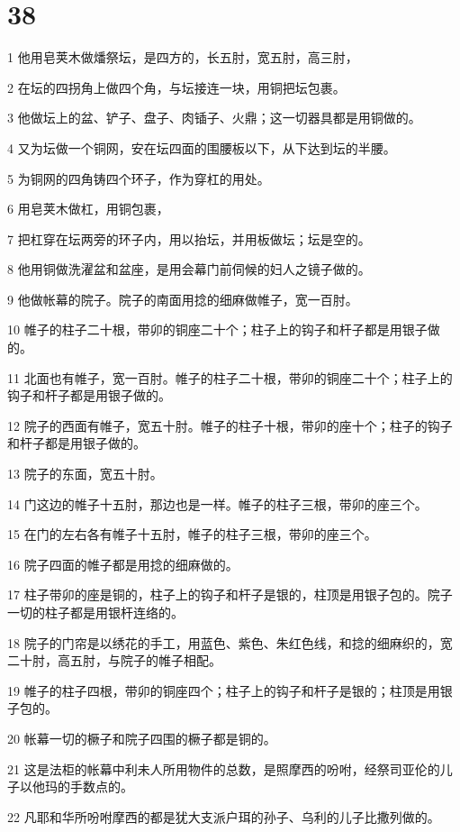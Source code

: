 \chapter{38}

\par 1 他用皂荚木做燔祭坛，是四方的，长五肘，宽五肘，高三肘，
\par 2 在坛的四拐角上做四个角，与坛接连一块，用铜把坛包裹。
\par 3 他做坛上的盆、铲子、盘子、肉锸子、火鼎；这一切器具都是用铜做的。
\par 4 又为坛做一个铜网，安在坛四面的围腰板以下，从下达到坛的半腰。
\par 5 为铜网的四角铸四个环子，作为穿杠的用处。
\par 6 用皂荚木做杠，用铜包裹，
\par 7 把杠穿在坛两旁的环子内，用以抬坛，并用板做坛；坛是空的。
\par 8 他用铜做洗濯盆和盆座，是用会幕门前伺候的妇人之镜子做的。
\par 9 他做帐幕的院子。院子的南面用捻的细麻做帷子，宽一百肘。
\par 10 帷子的柱子二十根，带卯的铜座二十个；柱子上的钩子和杆子都是用银子做的。
\par 11 北面也有帷子，宽一百肘。帷子的柱子二十根，带卯的铜座二十个；柱子上的钩子和杆子都是用银子做的。
\par 12 院子的西面有帷子，宽五十肘。帷子的柱子十根，带卯的座十个；柱子的钩子和杆子都是用银子做的。
\par 13 院子的东面，宽五十肘。
\par 14 门这边的帷子十五肘，那边也是一样。帷子的柱子三根，带卯的座三个。
\par 15 在门的左右各有帷子十五肘，帷子的柱子三根，带卯的座三个。
\par 16 院子四面的帷子都是用捻的细麻做的。
\par 17 柱子带卯的座是铜的，柱子上的钩子和杆子是银的，柱顶是用银子包的。院子一切的柱子都是用银杆连络的。
\par 18 院子的门帘是以绣花的手工，用蓝色、紫色、朱红色线，和捻的细麻织的，宽二十肘，高五肘，与院子的帷子相配。
\par 19 帷子的柱子四根，带卯的铜座四个；柱子上的钩子和杆子是银的；柱顶是用银子包的。
\par 20 帐幕一切的橛子和院子四围的橛子都是铜的。
\par 21 这是法柜的帐幕中利未人所用物件的总数，是照摩西的吩咐，经祭司亚伦的儿子以他玛的手数点的。
\par 22 凡耶和华所吩咐摩西的都是犹大支派户珥的孙子、乌利的儿子比撒列做的。
